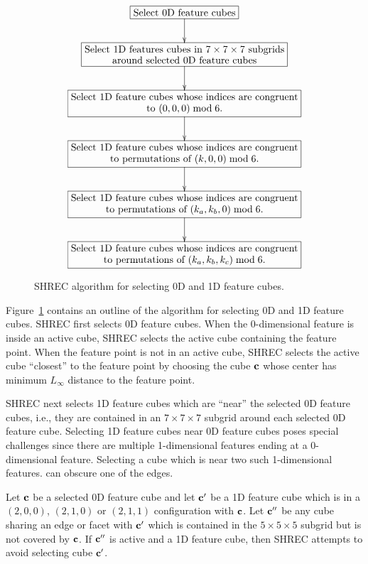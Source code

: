 \begin{figure}
\begin{equation*}
\xymatrix{
\action{Select 0D feature cubes} \ar[d] \\
\action{Select 1D features cubes in $7 \times 7 \times 7$ subgrids \\
around selected 0D feature cubes} \ar[d] \\
\action{Select 1D feature cubes whose indices are congruent \\
to $(0,0,0) \bmod 6$.} \ar[d] \\
\action{Select 1D feature cubes whose indices are congruent \\
to permutations of $(k,0,0) \bmod 6$.} \ar[d] \\
\action{Select 1D feature cubes whose indices are congruent \\
to permutations of $(k_a,k_b,0) \bmod 6$.} \ar[d] \\
\action{Select 1D feature cubes whose indices are congruent \\
to permutations of $(k_a,k_b,k_c) \bmod 6$.}
}
\end{equation*}
\caption{SHREC algorithm for selecting 0D and 1D feature cubes.}
\label{alg:SHREC_select}
\end{figure}

Figure~\ref{alg:SHREC_select} contains an outline of the algorithm 
for selecting 0D and 1D feature cubes.
SHREC first selects 0D feature cubes.
When the 0-dimensional feature is inside an active cube,
SHREC selects the active cube containing the feature point.
When the feature point is not in an active cube,
SHREC selects the active cube ``closest'' to the feature point
by choosing the cube $\mathbf{c}$ whose center has minimum $L_\infty$ distance
to the feature point.

SHREC next selects 1D feature cubes which are ``near'' 
the selected 0D feature cubes,
i.e., they are contained in an $7 \times 7 \times 7$ subgrid
around each selected 0D feature cube.
Selecting 1D feature cubes near 0D feature cubes poses special challenges
since there are multiple 1-dimensional features ending 
at a 0-dimensional feature.
Selecting a cube which is near two such 1-dimensional features.
can obscure one of the edges.

Let $\mathbf{c}$ be a selected 0D feature cube and let $\mathbf{c}'$ be a 1D feature cube
which is in a $(2,0,0)$, $(2,1,0)$ or $(2,1,1)$ configuration with $\mathbf{c}$.
Let $\mathbf{c}''$ be any cube sharing an edge or facet with $\mathbf{c}'$
which is contained in the $5 \times 5 \times 5$ subgrid
but is not covered by $\mathbf{c}$.
If $\mathbf{c}''$ is active and a 1D feature cube,
then SHREC attempts to avoid selecting cube $\mathbf{c}'$.

